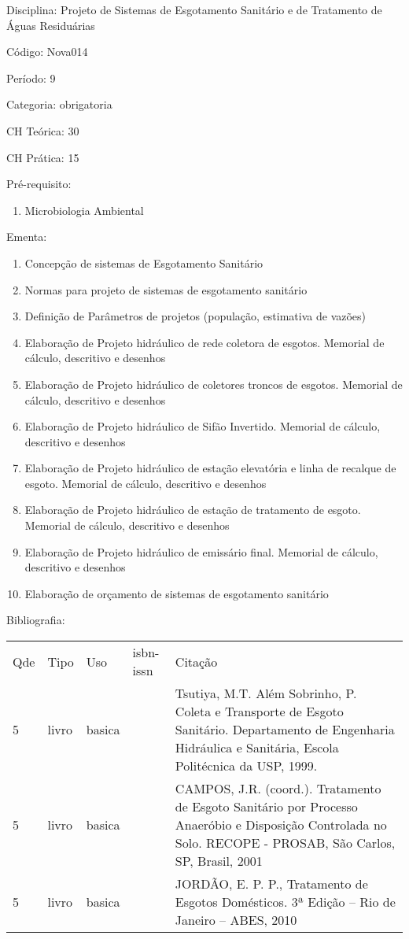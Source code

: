 \documentclass[12pt,a4paper,twoside]{report}
\begin{document}
Disciplina: Projeto de Sistemas de Esgotamento Sanitário e de Tratamento de Águas Residuárias

Código: Nova014

Período: 9

Categoria: obrigatoria

CH Teórica: 30

CH Prática: 15




Pré-requisito:
\begin{enumerate}
\item Microbiologia Ambiental
\end{enumerate}

Ementa:
\begin{enumerate}
\item Concepção de sistemas de Esgotamento Sanitário
\item Normas para projeto de sistemas de esgotamento sanitário
\item Definição de Parâmetros de projetos (população, estimativa de vazões)
\item Elaboração de Projeto hidráulico de rede coletora de esgotos. Memorial de cálculo, descritivo e desenhos
\item Elaboração de Projeto hidráulico de coletores troncos de esgotos. Memorial de cálculo, descritivo e desenhos
\item Elaboração de Projeto hidráulico de Sifão Invertido. Memorial de cálculo, descritivo e desenhos
\item Elaboração de Projeto hidráulico de estação elevatória e linha de recalque de esgoto. Memorial de cálculo, descritivo e desenhos
\item Elaboração de Projeto hidráulico de estação de tratamento de esgoto. Memorial de cálculo, descritivo e desenhos
\item Elaboração de Projeto hidráulico de emissário final. Memorial de cálculo, descritivo e desenhos
\item Elaboração de orçamento de sistemas de esgotamento sanitário
\end{enumerate}



Bibliografia:


\begin{tabular}{llllp{8cm}}
Qde & Tipo & Uso & isbn-issn & Citação \\
5&livro&basica&&Tsutiya, M.T. Além Sobrinho, P. Coleta e Transporte de Esgoto Sanitário. Departamento de Engenharia Hidráulica e Sanitária, Escola Politécnica da USP, 1999.\\
5&livro&basica&&CAMPOS, J.R. (coord.). Tratamento de Esgoto Sanitário por Processo Anaeróbio e Disposição Controlada no Solo. RECOPE - PROSAB, São Carlos, SP, Brasil, 2001\\
5&livro&basica&&JORDÃO, E. P. P., Tratamento de Esgotos Domésticos. 3ª Edição – Rio de Janeiro – ABES, 2010\\
\end{tabular}
\end{document}
